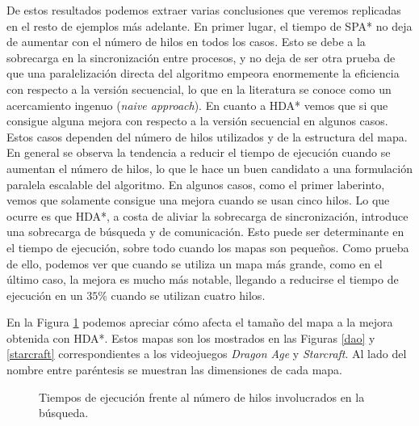 \documentclass[a4paper,12pt]{article}
\begin{document}
De estos resultados podemos extraer varias conclusiones que veremos replicadas en el resto de ejemplos más adelante. En primer lugar, el tiempo de SPA* no deja de aumentar con el número de hilos en todos los casos. Esto se debe a la sobrecarga en la sincronización entre procesos, y no deja de ser otra prueba de que una paralelización directa del algoritmo empeora enormemente la eficiencia con respecto a la versión secuencial, lo que en la literatura se conoce como un acercamiento ingenuo (\textit{naive approach}). En cuanto a HDA* vemos que si que consigue alguna mejora con respecto a la versión secuencial en algunos casos. Estos casos dependen del número de hilos utilizados y de la estructura del mapa. En general se observa la tendencia a reducir el tiempo de ejecución cuando se aumentan el número de hilos, lo que le hace un buen candidato a una formulación paralela escalable del algoritmo. En algunos casos, como el primer laberinto, vemos que solamente consigue una mejora cuando se usan cinco hilos. Lo que ocurre es que HDA*, a costa de aliviar la sobrecarga de sincronización, introduce una sobrecarga de búsqueda y de comunicación. Esto puede ser determinante en el tiempo de ejecución, sobre todo cuando los mapas son pequeños. Como prueba de ello, podemos ver que cuando se utiliza un mapa más grande, como en el último caso, la mejora es mucho más notable, llegando a reducirse el tiempo de ejecución en un $35\%$ cuando se utilizan cuatro hilos.

En la Figura \ref{games} podemos apreciar cómo afecta el tamaño del mapa a la mejora obtenida con HDA*. Estos mapas son los mostrados en las Figuras \ref{dao} y \ref{starcraft} correspondientes a los videojuegos \textit{Dragon Age} y \textit{Starcraft}. Al lado del nombre entre paréntesis se muestran las dimensiones de cada mapa.

\begin{figure}[H]
    \centering
    \begin{subfigure}[b]{0.49\textwidth}
        
    \end{subfigure}
    \hfill
    \begin{subfigure}[b]{0.49\textwidth}
        
    \end{subfigure}

    \caption{Tiempos de ejecución frente al número de hilos involucrados en la búsqueda.}
    \label{games}
\end{figure}
\end{document}

